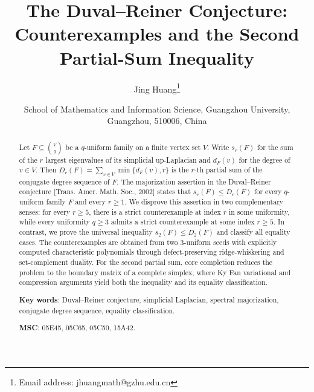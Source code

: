 \documentclass[11pt]{article}
\begin{document}
\title{\bf The Duval--Reiner Conjecture:  Counterexamples and the  Second Partial-Sum Inequality}

\author{
Jing Huang\footnote{Email address:
jhuangmath@gzhu.edu.cn
}}

\date{\small
School of Mathematics and Information Science, Guangzhou University, Guangzhou,  510006, China\\
}


\maketitle

\begin{abstract}
Let \(F\subseteq\binom{V}{q}\) be a \(q\)-uniform family on a finite
vertex set \(V\). Write \(s_r(F)\) for the sum of the \(r\) largest
eigenvalues of its simplicial up-Laplacian and \(d_F(v)\) for the
degree of \(v\in V\). Then $D_r(F)=\sum_{v\in V}\min\{d_F(v),r\}$
is the \(r\)-th partial sum of the conjugate degree sequence of \(F\).
The majorization assertion in the Duval--Reiner conjecture
[Trans. Amer. Math. Soc., 2002]
states that \(s_r(F)\le D_r(F)\) for every \(q\)-uniform family \(F\)
and every \(r\ge1\).
We disprove this assertion in two complementary senses: for every
\(r\ge5\), there is a strict counterexample at index \(r\) in some
uniformity, while every uniformity \(q\ge3\) admits a strict
counterexample at some index \(r\ge5\).
In contrast, we prove the universal inequality
\(s_2(F)\le D_2(F)\) and classify all equality cases.
The counterexamples are obtained from two \(3\)-uniform seeds with
explicitly computed characteristic polynomials through
defect-preserving ridge-whiskering and set-complement duality.
For the second partial sum, core completion reduces the problem to the
boundary matrix of a complete simplex, where Ky Fan variational and
compression arguments yield both the inequality and its equality
classification.

\medskip
{\bf Key words}: Duval--Reiner conjecture, simplicial Laplacian, spectral majorization,
conjugate degree sequence, equality classification.

\medskip
{\bf MSC}:  05E45, 05C65, 05C50, 15A42.

\end{abstract}
\end{document}

